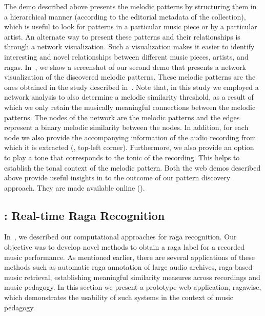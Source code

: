 The demo described above presents the melodic patterns by structuring them in a hierarchical manner (according to the editorial metadata of the collection), which is useful to look for patterns in a particular music piece or by a particular artist. An alternate way to present these patterns and their relationships is through a network visualization. Such a visualization makes it easier to identify interesting and novel relationships between different music pieces, artists, and \glspl{raga}. In~, we show a screenshot of our second demo that presents a network visualization of the discovered melodic patterns. These melodic patterns are the ones obtained in the study described in~. Note that, in this study we employed a network analysis to also determine a melodic similarity threshold, as a result of which we only retain the musically meaningful connections between the melodic patterns. The nodes of the network are the melodic patterns and the edges represent a binary melodic similarity between the nodes. In addition, for each node we also provide the accompanying information of the audio recording from which it is extracted (, top-left corner). Furthermore, we also provide an option to play a tone that corresponds to the tonic of the recording. This helps to establish the tonal context of the melodic pattern. Both the web demos described above provide useful insights in to the outcome of our pattern discovery approach. They are made available online (). 


\subsection*{: Real-time Raga Recognition}
\label{sec:ragawise}

In~, we described our computational approaches for \gls{raga} recognition. Our objective was to develop novel methods to obtain a \gls{raga} label for a recorded music performance. As mentioned earlier, there are several applications of these methods such as automatic \gls{raga} annotation of large audio archives, \gls{raga}-based music retrieval, establishing meaningful similarity measures across recordings and music pedagogy. In this section we present a prototype web application, \gls{ragawise}, which demonstrates the usability of such systems in the context of music pedagogy. 

